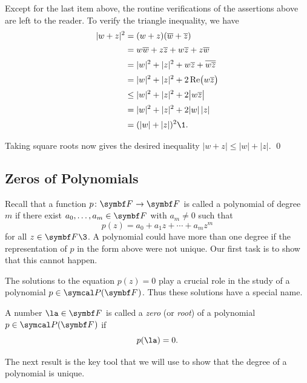 
\proof
Except for the last item above, the routine verifications of the assertions above are left to the reader. To verify the triangle inequality, we have
\vspace{.05in} %
\begin{align*}
|w + z|^2 &= (w + z)(\bar{w} + \bar{z}) \\[1.5bp]
&= w \bar{w} + z \bar{z} + w \bar{z} + z \bar{w} \\[1.5bp]
&= |w|^2 + |z|^2 + w \bar{z} + \overline{w \bar{z}} \\[1.5bp]
&= |w|^2 + |z|^2 + 2 \re\paren[\big]{w \bar{z}} \\[1.5bp]
&\le |w|^2 + |z|^2 + 2 \abs[\big]{w \bar{z}} \\[1.5bp]
&= |w|^2 + |z|^2 + 2 |w| \, |z| \\[1.5bp]
&= (|w| + |z|)^2\1.
\end{align*}


\noindent Taking square roots now gives the desired inequality $|w + z| \le |w| + |z|$.
\qed

\pagebreak[3]

\subsection{Zeros of Polynomials}

Recall that a function $p \colon \F{} \to \F{}$  is called a polynomial of degree $m$ if there exist $a_0, \dots, a_m \in \F{}$ with $a_m \ne 0$ such that
\[
p(z) = a_0 + a_1 z + \cdots + a_m z^m
\]
for all $z \in \F{}\3$. A polynomial could have more than one degree if the representation of $p$ in the form above were not unique. Our first task is to show that this cannot happen.

The solutions to the equation $p(z) = 0$ play a crucial role in the study of a polynomial $p \in \P(\F{})$. Thus these solutions have a special name.

{A number $\la \in \F{}$ is called a \emph{zero} (or \emph{root}) of a polynomial $p \in \P(\F{})$ if
\[
p(\la) = 0.
\]}

The next result is the key tool that we will use to show that the degree of a polynomial is unique.

